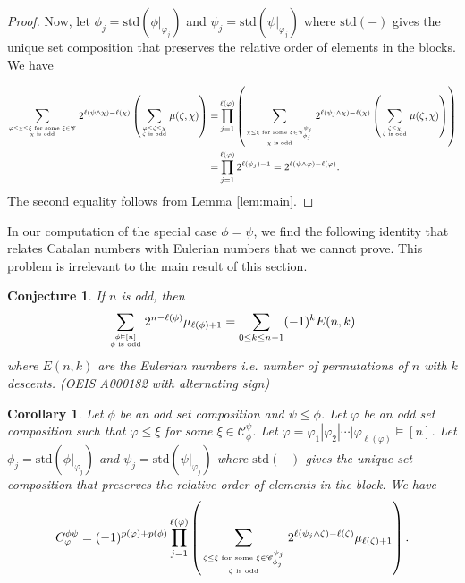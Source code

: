 \documentclass[11pt]{amsart}
\newtheorem{Corollary}[Theorem]{Corollary}
\newtheorem{Conjecture}[Theorem]{Conjecture}
\numberwithin{equation}{section}
\begin{document}
\begin{proof}
	Now, let $\phi_j=\mathrm{std}(\phi|_{\varphi_j})$ and $\psi_j=\mathrm{std}(\psi|_{\varphi_j})$ where $\mathrm{std}(-)$ gives the unique set composition that preserves the relative order of elements in the blocks. We have
	
	\begin{align*}
		\sum_{\varphi\leq\chi\leq\xi\text{ for some }\xi\in\mathscr{C} \atop \chi\text{ is odd}}2^{\ell(\psi\land\chi)-\ell(\chi)}\left(\sum_{\varphi\leq\zeta\leq\chi \atop \zeta\text{ is odd}}\mu(\zeta,\chi)\right)
		=&\prod_{j=1}^{\ell(\varphi)}\left(\sum_{\chi\leq\xi\text{ for some }\xi\in\mathscr{C}_{\phi_j}^{\psi_j} \atop \chi\text{ is odd}}2^{\ell(\psi_j\land\chi)-\ell(\chi)}\left(\sum_{\zeta\leq\chi \atop \zeta\text{ is odd}}\mu(\zeta,\chi)\right)\right)\\
		=&\prod_{j=1}^{\ell(\varphi)} 2^{\ell(\psi_j)-1}=2^{\ell(\psi\land\varphi)-\ell(\varphi)}.
	\end{align*}
	The second equality follows from Lemma \ref{lem:main}.
\end{proof}


In our computation of the special case $\phi=\psi$, we find the following identity that relates Catalan numbers with Eulerian numbers that we cannot prove. This problem is irrelevant to the main result of this section.

\begin{Conjecture}\label{conj:euler}
	If $n$ is odd, then
	$$\sum_{\phi\vDash[n] \atop \phi\text{ is odd}}2^{n-\ell(\phi)}\mu_{\ell(\phi)+1}=\sum_{0\leq k\leq n-1}(-1)^kE(n,k)$$
	where $E(n,k)$ are the Eulerian numbers i.e. number of permutations of $n$ with $k$ descents. (OEIS A000182 with alternating sign)
\end{Conjecture}

\begin{Corollary}\label{cor:main}
	Let $\phi$ be an odd set composition and $\psi\leq\phi$. Let $\varphi$ be an odd set composition  such that $\varphi\leq\xi$ for some $\xi\in\mathscr{C}_\phi^\psi$. Let $\varphi=\varphi_1|\varphi_2|\cdots|\varphi_{\ell(\varphi)}\vDash[n]$. Let $\phi_j=\mathrm{std}(\phi|_{\varphi_j})$ and $\psi_j=\mathrm{std}(\psi|_{\varphi_j})$ where $\mathrm{std}(-)$ gives the unique set composition that preserves the relative order of elements in the block. We have
	$$C_\varphi^{\phi\psi}=(-1)^{p(\varphi)+p(\phi)}\prod_{j=1}^{\ell(\varphi)}\left(\sum_{\zeta\leq\xi\text{ for some }\xi\in\mathscr{C}_{\phi_j}^{\psi_j} \atop \zeta\text{ is odd}}2^{\ell(\psi_j\land\zeta)-\ell(\zeta)}\mu_{\ell(\zeta)+1}\right).$$
\end{Corollary}
\end{document}
